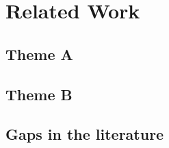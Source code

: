 \chapter{Related Work}
\label{chap:related}


\section{Theme A}
\label{sec:related:a}


\section{Theme B}
\label{sec:related:b}

\section{Gaps in the literature}
\label{sec:related:gaps}

